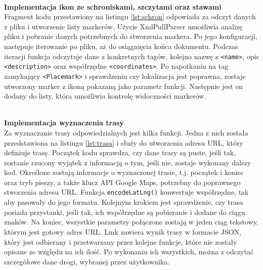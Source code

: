\\

\noindent
\textbf{Implementacja ikon ze schroniskami, szczytami oraz stawami} \\ 
\indent Fragment kodu przestawiony na listingu \ref{lst:schron} odpowiada za odczyt danych z pliku i utworzenie listy markerów. Użycie XmlPullParser umożliwia analizę pliku i pobranie danych potrzebnych do stworzenia markera. Po jego konfiguracji, następuje iterowanie po pliku, aż do osiągnięcia końca dokumentu. Podczas iteracji funkcja odczytuje dane z konkretnych tagów, kolejno nazwę z \verb|<name>|, opis \verb|<description>| oraz współrzędne \verb|<coordinates>|. Po napotkaniu na tag zamykający \verb|<Placemark>| i sprawdzeniu czy lokalizacja jest poprawna, zostaje utworzony marker z ikoną pokazaną jako parametr funkcji. Następnie jest on dodany do listy, która umożliwia kontrolę widoczności markerów. \\

\noindent
\begin{minipage}{\linewidth}
    \label{lst:schron}
    \centering
\end{minipage}\\


\textbf{Implementacja wyznaczenia trasy}\\
\indent Za wyznaczanie trasy odpowiedzialnych jest kilka funkcji. Jedna z nich została przedstawiona na listingu \ref{lst:trasa} i służy do utworzenia adresu URL, który definiuje trasę. Początek kodu sprawdza, czy dane trasy są puste, jeśli tak, zostanie rzucony wyjątek z informacją o tym, jeśli nie, zostaje wykonany dalszy kod. Określone zostają informacje o wyznaczonej trasie, t.j. początek i koniec oraz tryb pieszy, a także klucz API Google Maps, potrzebny do poprawnego stworzenia adresu URL. Funkcja \verb|encodeLatLng()| konwertuje współrzędne, tak aby pasowały do jego formatu. Kolejnym krokiem jest sprawdzenie, czy trasa posiada przystanki, jeśli tak, ich współrzędne są pobieranie i dodane do ciągu znaków. Na koniec, wszystkie parametry połączone zostają w jeden ciąg tekstowy, którym jest gotowy adres URL. Link zawiera wynik trasy w formacie JSON, który jest odbierany i przetwarzany przez kolejne funkcje, które nie zostały opisane ze względu na ich ilość. Po wykonaniu ich wszystkich, można z odczytać szczegółowe dane drogi, wybranej przez użytkownika. \\

